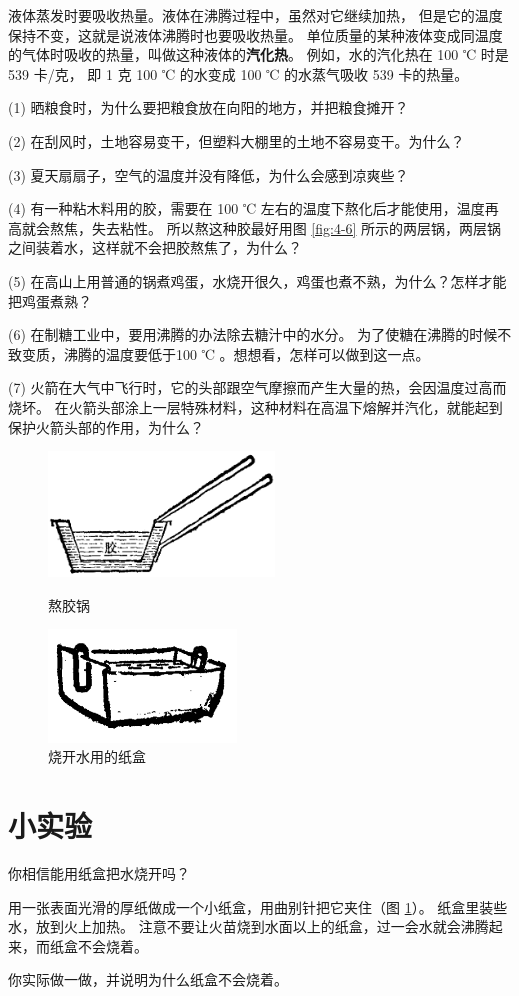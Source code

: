 液体蒸发时要吸收热量。液体在沸腾过程中，虽然对它继续加热，
但是它的温度保持不变，这就是说液体沸腾时也要吸收热量。
单位质量的某种液体变成同温度的气体时吸收的热量，叫做这种液体的\textbf{汽化热}。
例如，水的汽化热在 100 ℃ 时是 539 卡/克，
即 1 克 100 ℃ 的水变成 100 ℃ 的水蒸气吸收 539 卡的热量。



\lianxi

(1) 晒粮食时，为什么要把粮食放在向阳的地方，并把粮食摊开？

(2) 在刮风时，土地容易变干，但塑料大棚里的土地不容易变干。为什么？

(3) 夏天扇扇子，空气的温度并没有降低，为什么会感到凉爽些？

(4) 有一种粘木料用的胶，需要在 100 ℃ 左右的温度下熬化后才能使用，温度再高就会熬焦，失去粘性。
所以熬这种胶最好用图 \ref{fig:4-6} 所示的两层锅，两层锅之间装着水，这样就不会把胶熬焦了，为什么？

(5) 在高山上用普通的锅煮鸡蛋，水烧开很久，鸡蛋也煮不熟，为什么？怎样才能把鸡蛋煮熟？

(6) 在制糖工业中，要用沸腾的办法除去糖汁中的水分。
为了使糖在沸腾的时候不致变质，沸腾的温度要低于100 ℃ 。想想看，怎样可以做到这一点。

(7) 火箭在大气中飞行时，它的头部跟空气摩擦而产生大量的热，会因温度过高而烧坏。
在火箭头部涂上一层特殊材料，这种材料在高温下熔解并汽化，就能起到保护火箭头部的作用，为什么？


\begin{figure}[htbp]
    \centering
    \begin{minipage}{7cm}
    \centering
    \includegraphics[width=6cm]{../pic/czwl2-ch4-6}
    \caption{熬胶锅}\label{fig:4-6}
    \end{minipage}
    \qquad
    \begin{minipage}{7cm}
    \centering
    \includegraphics[width=5cm]{../pic/czwl2-ch4-7}
    \caption{烧开水用的纸盒}\label{fig:4-7}
    \end{minipage}
\end{figure}


\section*{小实验}

你相信能用纸盒把水烧开吗？

用一张表面光滑的厚纸做成一个小纸盒，用曲别针把它夹住（图 \ref{fig:4-7}）。
纸盒里装些水，放到火上加热。
注意不要让火苗烧到水面以上的纸盒，过一会水就会沸腾起来，而纸盒不会烧着。

你实际做一做，并说明为什么纸盒不会烧着。

